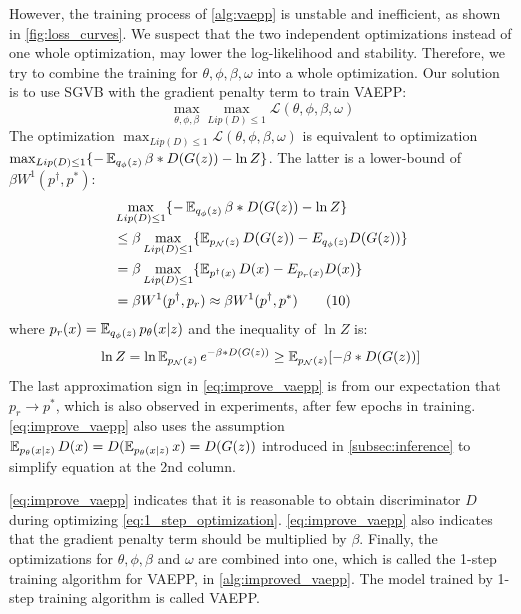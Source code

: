 However, the training process of \cref{alg:vaepp} is unstable and inefficient, as shown in \cref{fig:loss_curves}. 
We suspect that the two independent optimizations instead of one whole optimization, may lower the log-likelihood and stability. Therefore, we try to combine the training for $\theta, \phi, \beta, \omega$ into a whole optimization. 
Our solution is to use SGVB with the gradient penalty term to train VAEPP:
\begin{equation*}~\label{eq:1_step_optimization}
	\max_{\theta, \phi, \beta} \max_{Lip(D) \leq 1} \mathcal{L}(\theta, \phi, \beta, \omega) 
\end{equation*} 
The optimization $\max_{Lip(D) \leq 1} \mathcal{L}(\theta, \phi, \beta, \omega)$ is equivalent to optimization $\max_{Lip(D) \leq 1} \{ -\operatorname{\mathbb{E}}_{q_\phi(z)} \beta*D(G(z)) - \ln Z \}$. 
The latter is a lower-bound of $\beta W^1(p^\dag, p^*)$:
\begin{align*}\label{eq:improve_vaepp}
	&\max_{Lip(D) \leq 1} \{ -\operatorname{\mathbb{E}}_{q_\phi(z)} \beta*D(G(z)) - \ln Z \}\\ 
	&\leq \beta \max_{Lip(D) \leq 1} \{ \operatorname{\mathbb{E}}_{p_\mathcal{N}(z)} D(G(z)) - E_{q_\phi(z)} D(G(z)) \} \\
	&= \beta \max_{Lip(D) \leq 1} \{ \operatorname{\mathbb{E}}_{p^\dag(x)} D(x) - E_{p_r(x)} D(x) \} \\
	&= \beta W^1(p^\dag, p_r) \approx \beta W^1(p^\dag, p^*) \tag{10} 
\end{align*}
where $p_r(x) = \operatorname{\mathbb{E}}_{q_\phi(z)} p_\theta(x|z)$ and the inequality of $\ln Z$ is:
\begin{equation*}
	\ln Z = \ln \operatorname{\mathbb{E}}_{p_\mathcal{N}(z)} e^{- \beta * D(G(z))} \geq \operatorname{\mathbb{E}}_{p_\mathcal{N}(z)} [- \beta * D(G(z))]
\end{equation*}
The last approximation sign in \cref{eq:improve_vaepp} is from our expectation that $p_r \rightarrow p^*$, which is also observed in experiments, after few epochs in training. \cref{eq:improve_vaepp} also uses the assumption $\operatorname{\mathbb{E}}_{p_\theta(x|z)} D(x) = D(\operatorname{\mathbb{E}}_{p_\theta(x|z)} x) = D(G(z))$ introduced in \cref{subsec:inference} to simplify equation at the 2nd column. 

\cref{eq:improve_vaepp} indicates that it is reasonable to obtain  discriminator $D$ during optimizing \cref{eq:1_step_optimization}. \cref{eq:improve_vaepp} also indicates that the gradient penalty term should be multiplied by $\beta$. Finally, the optimizations for $\theta, \phi, \beta$ and $\omega$ are combined into one, which is called the 1-step training algorithm for VAEPP, in \cref{alg:improved_vaepp}. The model trained by 1-step training algorithm is called VAEPP. 

